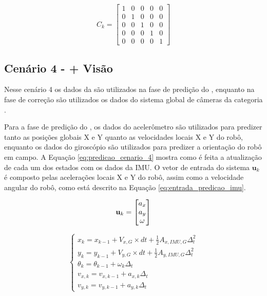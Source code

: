 \documentclass[acronym, symbols, table]{fei}
\begin{document}
			\begin{equation}\label{eq:matriz_C_cenario_3}
				C_{k} = \begin{bmatrix}
					1 & 0 & 0 & 0 & 0 \\
					0 & 1 & 0 & 0 & 0 \\
					0 & 0 & 1 & 0 & 0 \\
					0 & 0 & 0 & 1 & 0 \\
					0 & 0 & 0 & 0 & 1
				\end{bmatrix}
			\end{equation}
		
		\subsection{Cenário 4 -  + Visão}
		
			Nesse cenário 4 os dados da  são utilizados na fase de predição do , enquanto na fase de correção são utilizados os dados do sistema global de câmeras da categoria .
			
			Para a fase de predição do , os dados do acelerômetro são utilizados para predizer tanto as posições globais X e Y quanto as velocidades locais X e Y do robô, enquanto os dados do giroscópio são utilizados para predizer a orientação do robô em campo. A Equação \ref{eq:predicao_cenario_4} mostra como é feita a atualização de cada um dos estados com os dados da IMU. O vetor de entrada do sistema $\textbf{u}_k$ é composto pelas acelerações locais X e Y do robô, assim como a velocidade angular do robô, como está descrito na Equação \ref{eq:entrada_predicao_imu}.
			
			\begin{equation}\label{eq:entrada_predicao_imu}
				\text{\textbf{u}}_k =
				\begin{bmatrix}
					a_{x} \\
					a_{y} \\
					\omega
				\end{bmatrix}
			\end{equation}
			
			\begin{equation}\label{eq:predicao_cenario_4}
				\begin{cases}
					x_{k} = x_{k-1} + V_{x,G} \times dt + \frac{1}{2}A_{x,IMU,G} \Delta_t^2 \\
					y_{k} = y_{k-1} + V_{y,G} \times dt + \frac{1}{2}A_{y,IMU,G} \Delta_t^2 \\
					\theta_{k} = \theta_{k-1} + \omega_{k} \Delta_t \\
					v_{x,k} = v_{x,k-1} + a_{x,k} \Delta_t\\
					v_{y,k} = v_{y,k-1} + a_{y,k} \Delta_t
				\end{cases}
			\end{equation}
\end{document}
